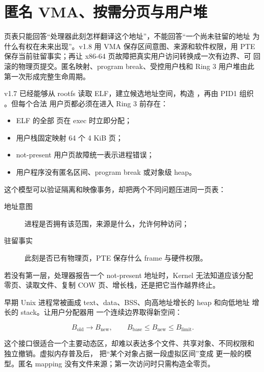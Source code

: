 \section{匿名 VMA、按需分页与用户堆}

\begin{keyidea}
页表只能回答“处理器此刻怎样翻译这个地址”，不能回答“一个尚未驻留的地址
为什么有权在未来出现”。v1.8 用 VMA 保存区间意图、来源和软件权限，用 PTE
保存当前驻留事实；再让 x86-64 页故障把真实用户访问转换成一次有边界、可
回滚的物理页提交。匿名映射、program break、受控用户栈和 Ring 3 用户堆由此
第一次形成完整生命周期。
\end{keyidea}

v1.7 已经能够从 rootfs 读取 ELF，建立候选地址空间，构造
，再由 PID1 组织 。但每个合法
用户页都必须在进入 Ring 3 前存在：

\begin{itemize}
  \item ELF 的全部  页在 exec 时立即分配；
  \item 用户栈固定映射 64 个 4 KiB 页；
  \item not-present 用户页故障统一表示进程错误；
  \item 用户程序没有匿名区间、program break 或对象级 heap。
\end{itemize}

这个模型可以验证隔离和映像事务，却把两个不同问题压进同一页表：

\begin{description}
  \item[地址意图] 进程是否拥有该范围，来源是什么，允许何种访问；
  \item[驻留事实] 此刻是否已有物理页，PTE 保存什么 frame 与硬件权限。
\end{description}

若没有第一层，处理器报告一个 not-present 地址时，Kernel 无法知道应该分配
零页、读取文件、复制 COW 页、增长栈，还是把它当作越界终止。

早期 Unix 进程常被画成 text、data、BSS、向高地址增长的 heap 和向低地址
增长的 stack。让用户分配器用
一个连续边界取得新空间：

\[
  B_{\mathrm{old}}\longrightarrow B_{\mathrm{new}},
  \qquad B_{\mathrm{base}}\le B_{\mathrm{new}}\le B_{\mathrm{limit}}.
\]

这个接口很适合一个主要动态区，却难以表达多个文件、共享对象、不同权限和
独立撤销。虚拟内存普及后， 把“某个对象占据一段虚拟区间”变成
更一般的模型。匿名 mapping 没有文件来源；第一次访问时只需构造全零页。

